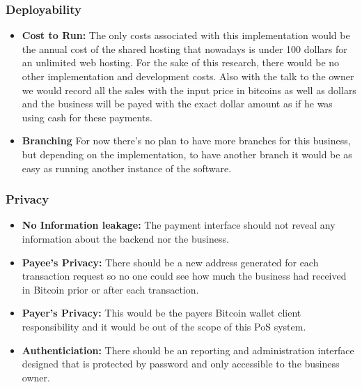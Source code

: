 \subsubsection{Deployability}
\begin{itemize}

\item \textbf{Cost to Run: } The only costs associated with this implementation would be the annual cost of the shared hosting that nowadays is under 100 dollars for an unlimited web hosting. For the sake of this research, there would be no other implementation and development costs. Also with the talk to the owner we would record all the sales with the input price in bitcoins as well as dollars and the business will be payed with the exact dollar amount as if he was using cash for these payments.

\item \textbf{Branching} For now there's no plan to have more branches for this business, but depending on the implementation, to have another branch it would be as easy as running another instance of the software.

\end{itemize}
 
\subsubsection{Privacy} 
\begin{itemize}

\item \textbf{No Information leakage: } The payment interface should not reveal any information about the backend nor the business.

\item \textbf{Payee's Privacy: } There should be a new address generated for each transaction request so no one could see how much the business had received in Bitcoin prior or after each transaction.

\item \textbf{Payer's Privacy: } This would be the payers Bitcoin wallet client responsibility and it would be out of the scope of this PoS system.

\item \textbf{Authenticiation: } There should be an reporting and administration interface designed that is protected by password and only accessible to the business owner.

\end{itemize}

